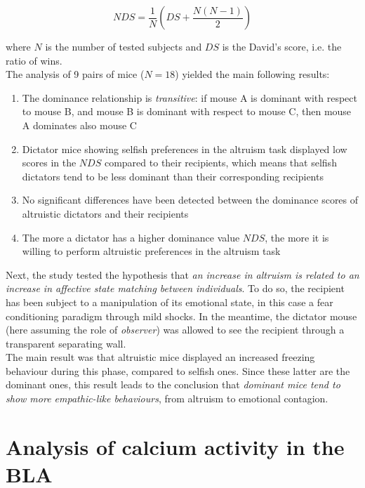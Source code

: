 \documentclass[12pt, a4paper]{report}
\begin{document}
\begin{equation}
NDS = \frac{1}{N}\left(DS + \frac{N(N-1)}{2}\right)
\end{equation}

where $N$ is the number of tested subjects and $DS$ is the David's score, i.e. the ratio of wins.\\
The analysis of 9 pairs of mice ($N=18$) yielded the main following results:

\begin{enumerate}
	\item The dominance relationship is \textit{transitive}: if mouse A is dominant with respect to mouse B, and mouse B is dominant with respect to mouse C, then mouse A dominates also mouse C 
	
	\item Dictator mice showing selfish preferences in the altruism task displayed low scores in the $NDS$ compared to their recipients, which means that selfish dictators  tend to be less dominant than their corresponding recipients
	
	\item No significant differences have been detected between the dominance scores of altruistic dictators and their recipients
	
	\item The more a dictator has a higher dominance value $NDS$, the more it is willing to perform altruistic preferences in the altruism task
	
\end{enumerate}

Next, the study tested the hypothesis that \textit{an increase in altruism is related to an increase in affective state matching between individuals}. To do so, the recipient has been subject to a manipulation of its emotional state, in this case a fear conditioning paradigm through mild shocks. In the meantime, the dictator mouse (here assuming the role of \textit{observer}) was allowed to see the recipient through a transparent separating wall.\\
The main result was that altruistic mice displayed an increased freezing behaviour during this phase, compared to selfish ones. Since these latter are the dominant ones, this result leads to the conclusion that \textit{dominant mice tend to show more empathic-like behaviours}, from altruism to emotional contagion.

\section{Analysis of calcium activity in the BLA} \label{section 4.5}
\end{document}
